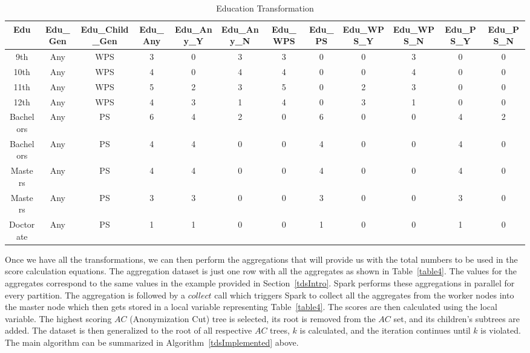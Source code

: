 \documentclass[11pt]{article}       %
\begin{document}
\begin{table}[htp]
\begin{adjustbox}{width=\textwidth, center}
\begin{tabular}{|c|c|c|c|c|c|c|c|c|c|c|c|}
\hline
Edu & Edu\_Gen & Edu\_Child\_Gen & Edu\_Any & Edu\_Any\_Y & Edu\_Any\_N & Edu\_WPS & Edu\_PS & Edu\_WPS\_Y & Edu\_WPS\_N & Edu\_PS\_Y & Edu\_PS\_N\\
\hline
9th & Any & WPS & 3 & 0 & 3 & 3 & 0 & 0 & 3 & 0 & 0\\
10th & Any & WPS & 4 & 0 & 4 & 4 & 0 & 0 & 4 & 0 & 0\\
11th & Any & WPS & 5 & 2 & 3 & 5 & 0 & 2 & 3 & 0 & 0\\
12th & Any & WPS & 4 & 3 & 1 & 4 & 0 & 3 & 1 & 0 & 0\\
Bachelors & Any & PS & 6 & 4 & 2 & 0 & 6 & 0 & 0 & 4 & 2\\
Bachelors & Any & PS & 4 & 4 & 0 & 0 & 4 & 0 & 0 & 4 & 0\\
Masters & Any & PS & 4 & 4 & 0 & 0 & 4 & 0 & 0 & 4 & 0\\
Masters & Any & PS & 3 & 3 & 0 & 0 & 3 & 0 & 0 & 3 & 0\\
Doctorate & Any & PS & 1 & 1 & 0 & 0 & 1 & 0 & 0 & 1 & 0\\
\hline
\end{tabular}
\end{adjustbox}
\caption{Education Transformation}
\label{table3}
\end{table}

Once we have all the transformations, we can then perform the aggregations that will provide us with the total numbers to be used in the score calculation equations. The aggregation dataset is just one row with all the aggregates as shown in Table~\ref{table4}. The values for the aggregates correspond to the same values in the example provided in Section~\ref{tdsIntro}. Spark performs these aggregations in parallel for every partition. The aggregation is followed by a $collect$ call which triggers Spark to collect all the aggregates from the worker nodes into the master node which then gets stored in a local variable representing Table~\ref{table4}. The scores are then calculated using the local variable. The highest scoring $AC$ (Anonymization Cut) tree is selected, its root is removed from the $AC$ set, and its children's subtrees are added. The dataset is then generalized to the root of all respective $AC$ trees, $k$ is calculated, and the iteration continues until $k$ is violated. The main algorithm can be summarized in Algorithm~\ref{tdsImplemented} above.
\end{document}
